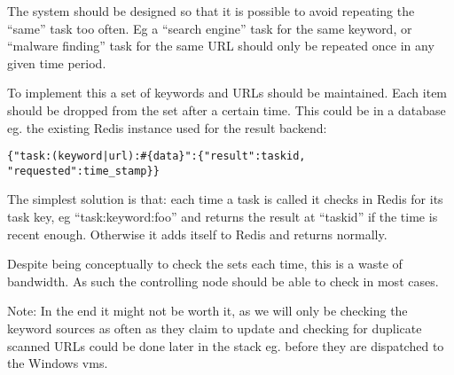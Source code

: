 The system should be designed so that it is possible to avoid repeating the ``same'' task too often. Eg a ``search engine'' task for the same keyword, or ``malware finding'' task for the same URL should only be repeated once in any given time period.

To implement this a set of keywords and URLs should be maintained. Each item should be dropped from the set after a certain time. This could be in a database eg. the existing Redis instance used for the result backend:

\verb/{"task:(keyword|url):#{data}":{"result":taskid, "requested":time_stamp}}/

The simplest solution is that: each time a task is called it checks in Redis for its task key, eg ``task:keyword:foo'' and returns the result at ``taskid'' if the time is recent enough. Otherwise it adds itself to Redis and returns normally.

Despite being conceptually to check the sets each time, this is a waste of bandwidth. As such the controlling node should be able to check in most cases.

Note: In the end it might not be worth it, as we will only be checking the keyword sources as often as they claim to update and checking for duplicate scanned URLs could be done later in the stack eg. before they are dispatched to the Windows vms.